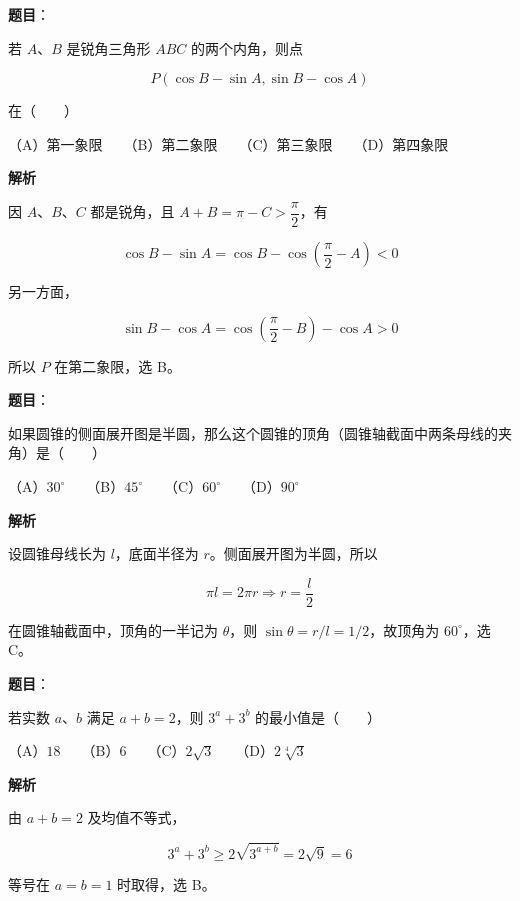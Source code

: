 \begin{answer}

\textbf{题目}：

若 $A\text{、}B$ 是锐角三角形 $ABC$ 的两个内角，则点

\nopagebreak[4]
\[
P(\cos B-\sin A,\sin B-\cos A)
\]

在\mbox{（　　）}

（A）第一象限　　（B）第二象限　　（C）第三象限　　（D）第四象限

\textbf{解析}

因 $A\text{、}B\text{、}C$ 都是锐角，且 $A+B=\pi-C>\dfrac\pi2$，有

\nopagebreak[4]
\[
\cos B-\sin A
=\cos B-\cos\left(\frac\pi2-A\right)<0
\]

另一方面，

\nopagebreak[4]
\[
\sin B-\cos A
=\cos\left(\frac\pi2-B\right)-\cos A>0
\]

所以 $P$ 在第二象限，选 B。


\end{answer}
\begin{answer}

\textbf{题目}：

如果圆锥的侧面展开图是半圆，那么这个圆锥的顶角（圆锥轴截面中两条母线的夹角）是\mbox{（　　）}

（A）$30^\circ$　　（B）$45^\circ$　　（C）$60^\circ$　　（D）$90^\circ$

\textbf{解析}

设圆锥母线长为 $l$，底面半径为 $r$。侧面展开图为半圆，所以

\nopagebreak[4]
\[
\pi l=2\pi r
\Longrightarrow r=\frac l2
\]

在圆锥轴截面中，顶角的一半记为 $\theta$，则 $\sin\theta=r/l=1/2$，故顶角为 $60^\circ$，选 C。


\end{answer}
\begin{answer}

\textbf{题目}：

若实数 $a\text{、}b$ 满足 $a+b=2$，则 $3^a+3^b$ 的最小值是\mbox{（　　）}

（A）$18$　　（B）$6$　　（C）$2\sqrt3$　　（D）$2\sqrt[4]{3}$

\textbf{解析}

由 $a+b=2$ 及均值不等式，

\nopagebreak[4]
\[
3^a+3^b\ge2\sqrt{3^{a+b}}=2\sqrt9=6
\]

等号在 $a=b=1$ 时取得，选 B。


\end{answer}
